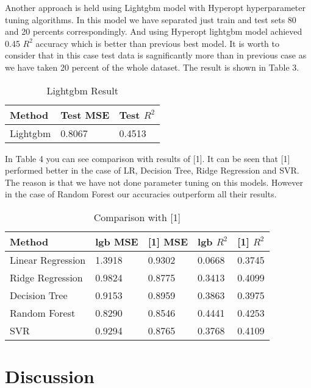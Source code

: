 \documentclass{article}
\begin{document}
Another approach is held using Lightgbm model with Hyperopt hyperparameter tuning algorithms. In this model we have separated just train and test sets 80 and 20 percents correspondingly. And using Hyperopt lightgbm model achieved 0.45 $R^2$ accuracy which is better than previous best model. It is worth to consider that in this case test data is sagnificantly more than in previous case as we have taken 20 percent of the whole dataset. The result is shown in Table 3.

\begin{table}
  \caption{Lightgbm Result}
  \label{lgb_results-table}
  \centering
  \begin{tabular}{lll}
    \toprule
    Method & Test MSE &  Test $R^2$  \\
    \midrule
    Lightgbm & 0.8067  & 0.4513   \\
        \bottomrule
  \end{tabular}
\end{table}

In Table 4 you can see comparison with results of [1]. It can be seen that [1] performed better in the case of LR, Decision Tree, Ridge Regression and SVR. The reason is that we have not done parameter tuning on this models. However in the case of Random Forest our accuracies outperform all their results. 

\begin{table}
  \caption{Comparison with [1]}
  \label{cmp_results-table}
  \centering
  \begin{tabular}{lllll}
    \toprule
    Method & lgb MSE & [1] MSE &  lgb $R^2$  & [1] $R^2$  \\
    \midrule
    Linear Regression & 1.3918 & 0.9302  & 0.0668  & 0.3745   \\
    Ridge Regression & 0.9824 & 0.8775  & 0.3413 & 0.4099  \\
    Decision Tree & 0.9153  & 0.8959 & 0.3863  & 0.3975 \\
    Random Forest & 0.8290  & 0.8546 & 0.4441 & 0.4253 \\
    SVR & 0.9294 & 0.8765 & 0.3768  & 0.4109 \\
        \bottomrule
  \end{tabular}
\end{table}

\section{Discussion}
\end{document}

